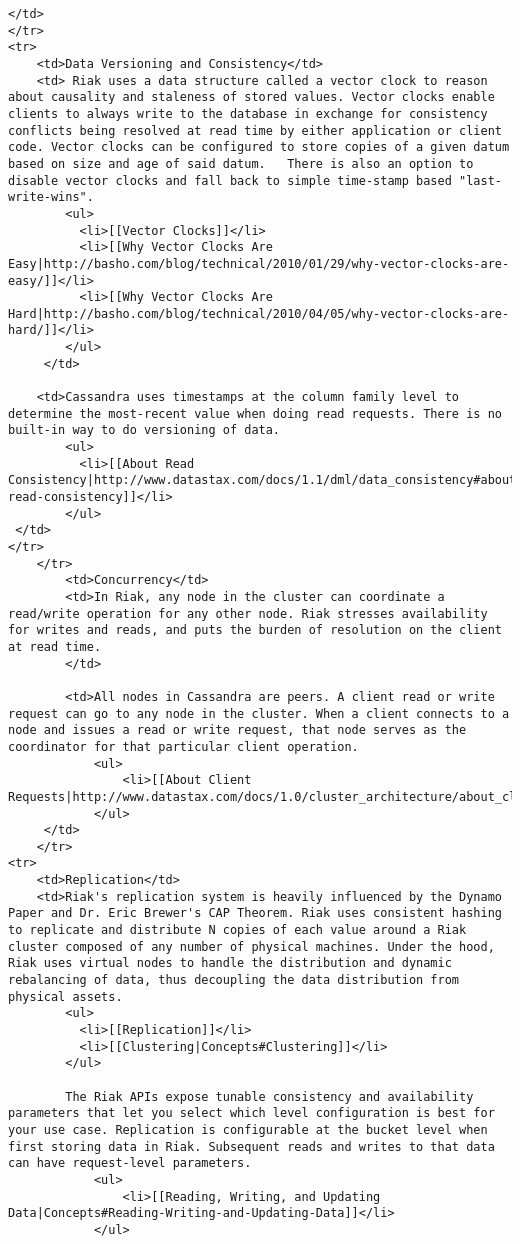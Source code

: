 \documentclass[letter]{book}
\newcounter{tab}[chapter]
\begin{document}
\begin{shaded}
\begin{verbatim}
</td>
</tr>
<tr>
    <td>Data Versioning and Consistency</td>
    <td> Riak uses a data structure called a vector clock to reason about causality and staleness of stored values. Vector clocks enable clients to always write to the database in exchange for consistency conflicts being resolved at read time by either application or client code. Vector clocks can be configured to store copies of a given datum based on size and age of said datum.   There is also an option to disable vector clocks and fall back to simple time-stamp based "last-write-wins".
        <ul>
          <li>[[Vector Clocks]]</li>
          <li>[[Why Vector Clocks Are Easy|http://basho.com/blog/technical/2010/01/29/why-vector-clocks-are-easy/]]</li>
          <li>[[Why Vector Clocks Are Hard|http://basho.com/blog/technical/2010/04/05/why-vector-clocks-are-hard/]]</li>
        </ul>
     </td>

    <td>Cassandra uses timestamps at the column family level to determine the most-recent value when doing read requests. There is no built-in way to do versioning of data.
        <ul>
          <li>[[About Read Consistency|http://www.datastax.com/docs/1.1/dml/data_consistency#about-read-consistency]]</li>
        </ul>
 </td>
</tr>
    </tr>
        <td>Concurrency</td>
        <td>In Riak, any node in the cluster can coordinate a read/write operation for any other node. Riak stresses availability for writes and reads, and puts the burden of resolution on the client at read time.
        </td>

        <td>All nodes in Cassandra are peers. A client read or write request can go to any node in the cluster. When a client connects to a node and issues a read or write request, that node serves as the coordinator for that particular client operation.
            <ul>
                <li>[[About Client Requests|http://www.datastax.com/docs/1.0/cluster_architecture/about_client_requests]]
            </ul>
     </td>
    </tr>
<tr>
    <td>Replication</td>
    <td>Riak's replication system is heavily influenced by the Dynamo Paper and Dr. Eric Brewer's CAP Theorem. Riak uses consistent hashing to replicate and distribute N copies of each value around a Riak cluster composed of any number of physical machines. Under the hood, Riak uses virtual nodes to handle the distribution and dynamic rebalancing of data, thus decoupling the data distribution from physical assets.
        <ul>
          <li>[[Replication]]</li>
          <li>[[Clustering|Concepts#Clustering]]</li>
        </ul>

        The Riak APIs expose tunable consistency and availability parameters that let you select which level configuration is best for your use case. Replication is configurable at the bucket level when first storing data in Riak. Subsequent reads and writes to that data can have request-level parameters.
            <ul>
                <li>[[Reading, Writing, and Updating Data|Concepts#Reading-Writing-and-Updating-Data]]</li>
            </ul>


\end{verbatim}
\end{shaded}
\end{document}
